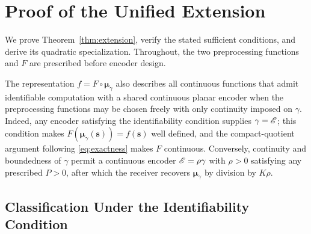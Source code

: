 \section{Proof of the Unified Extension}\label{app:polynomial}

We prove Theorem~\ref{thm:extension}, verify the stated sufficient conditions, and derive its quadratic specialization. Throughout, the two preprocessing functions and $F$ are prescribed before encoder design.

The representation $f=F\circ\boldsymbol\mu_\gamma$ also describes all continuous functions that admit identifiable computation with a shared continuous planar encoder when the preprocessing functions may be chosen freely with only continuity imposed on $\gamma$. Indeed, any encoder satisfying the identifiability condition supplies $\gamma=\mathscr E$; this condition makes $F(\boldsymbol\mu_\gamma(\mathbf s))=f(\mathbf s)$ well defined, and the compact-quotient argument following \eqref{eq:exactness} makes $F$ continuous. Conversely, continuity and boundedness of $\gamma$ permit a continuous encoder $\mathscr E=\rho\gamma$ with $\rho>0$ satisfying any prescribed $P>0$, after which the receiver recovers $\boldsymbol\mu_\gamma$ by division by $K\rho$.

\subsection{Classification Under the Identifiability Condition}

